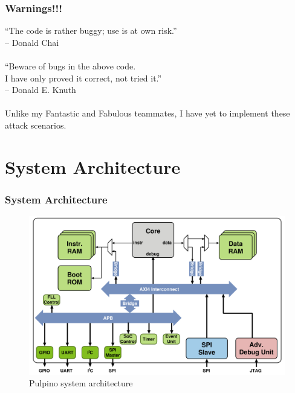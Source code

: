\documentclass[xcolor={usenames,dvipsnames},hyperref={hyperindex,bookmarks}]{beamer}
\begin{document}
\frame
{
	\frametitle{Warnings!!!}

	``The code is rather buggy; use is at own risk.'' \\
	-- Donald Chai \\
	\ \\
	``Beware of bugs in the above code. \\
	I have only proved it correct, not tried it.'' \\
	-- Donald E. Knuth \ \\
	\ \\
	Unlike my Fantastic and Fabulous teammates, I have yet to implement these attack scenarios.
}




\section{System Architecture}

\frame
{
	\frametitle{System Architecture}


\begin{figure}[h]
\centering 
\includegraphics[height=2.2 in]{./pics/PULPino_System_Architecture}
\caption{Pulpino system architecture}
\label{fig:PULPinoSystemArchitecture}
\end{figure}
}
\end{document}
